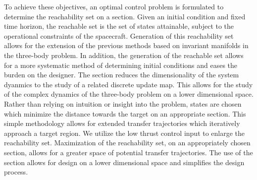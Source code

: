 \documentclass[preprint]{elsarticle}
\begin{document}
To achieve these objectives, an optimal control problem is formulated to determine the reachability set on a \Poincare section.
Given an initial condition and fixed time horizon, the reachable set is the set of states attainable, subject to the operational constraints of the spacecraft. 
Generation of this reachability set allows for the extension of the previous methods based on invariant manifolds in the three-body problem.
In addition, the generation of the reachable set allows for a more systematic method of determining initial conditions and eases the burden on the designer. 
The \Poincare section reduces the dimensionality of the system dyanmics to the study of a related discrete update map.  
This allows for the study of the complex dynamics of the three-body problem on a lower dimensional space.
Rather than relying on intuition or insight into the problem, states are chosen which minimize the distance towards the target on an appropriate \Poincare section.
This simple methodology allows for extended transfer trajectories which iteratively approach a target region.
We utilize the low thrust control input to enlarge the reachability set.
Maximization of the reachability set, on an appropriately chosen \Poincare section, allows for a greater space of potential transfer trajectories.
The use of the \Poincare section allows for design on a lower dimensional space and simplifies the design process.
\end{document}
